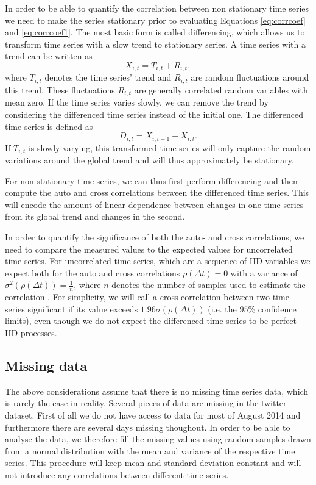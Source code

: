 \documentclass[12pt, a4paper]{article}
\begin{document}
In order to be able to quantify the correlation between non stationary time series we need to make the series stationary prior to evaluating Equations \ref{eq:corrcoef} and \ref{eq:corrcoef1}. The most basic form is called differencing, which allows us to transform time series with a slow trend to stationary series. A time series with a trend can be written as \cite{dettling14}
\begin{equation}
X_{i, t} = T_{i, t} + R_{i, t},
\end{equation} 
where $T_{i, t}$ denotes the time series' trend and $R_{i, t}$ are random fluctuations around this trend. These fluctuations $R_{i, t}$ are generally correlated random variables with mean zero. If the time series varies slowly, we can remove the trend by considering the differenced time series instead of the initial one. The differenced time series is defined as \cite{dettling14}
\begin{equation}
D_{i, t} = X_{i, t+1}- X_{i, t}.
\end{equation} 
If $T_{i, t}$ is slowly varying, this transformed time series will only capture the random variations around the global trend and will thus approximately be stationary.

For non stationary time series, we can thus first perform differencing and then compute the auto and cross correlations between the differenced time series. This will encode the amount of linear dependence between changes in one time series from its global trend and changes in the second. 

In order to quantify the significance of both the auto- and cross correlations, we need to compare the measured values to the expected values for uncorrelated time series. For uncorrelated time series, which are a sequence of IID variables we expect both for the auto and cross correlations $\rho(\Delta t) = 0$ with a variance of $\sigma^{2}(\rho(\Delta t)) = \frac{1}{n}$, where $n$ denotes the number of samples used to estimate the correlation \cite{dettling14}. For simplicity, we will call a cross-correlation between two time series significant if its value exceeds $1.96 \sigma(\rho(\Delta t))$ (i.e. the $95 \%$ confidence limits), even though we do not expect the differenced time series to be perfect IID processes. 

\subsection{Missing data}
The above considerations assume that there is no missing time series data, which is rarely the case in reality. Several pieces of data are missing in the twitter dataset. First of all we do not have access to data for most of August 2014 and furthermore there are several days missing thoughout. In order to be able to analyse the data, we therefore fill the missing values using random samples drawn from a normal distribution with the mean and variance of the respective time series. This procedure will keep mean and standard deviation constant and will not introduce any correlations between different time series.
\end{document}
